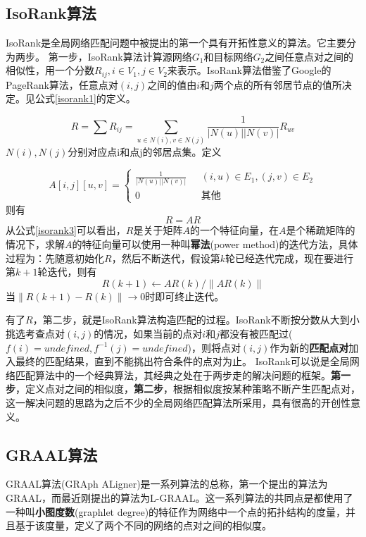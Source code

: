 \subsection{IsoRank算法}
IsoRank是全局网络匹配问题中被提出的第一个具有开拓性意义的算法。它主要分为两步。
第一步，IsoRank算法计算源网络$G_1$和目标网络$G_2$之间任意点对之间的相似性，用一个分数$R_{ij},i\in V_1,j\in V_2$来表示。IsoRank算法借鉴了Google的PageRank算法，任意点对$(i,j)$之间的值由$i$和$j$两个点的所有邻居节点的值所决定。见公式\ref{isorank1}的定义。

\begin{equation}\label{isorank1}
R=\sum R_{ij}=\sum_{u\in N(i),v\in N(j)}\frac{1}{\left | N(u) \right |\left | N(v) \right |}R_{uv}
\end{equation}
$N(i),N(j)$分别对应点i和点j的邻居点集。定义

\begin{equation}\label{isorank2}
A[i,j][u,v]=\begin{cases}
\frac{1}{\left | N(u) \right |\left | N(v) \right |} & \text{  } (i,u)\in E_1, (j,v)\in E_2 \\ 
 0& \text{  } \text{其他}
\end{cases}
\end{equation}
则有
\begin{equation}\label{isorank3}
R=AR
\end{equation}
从公式\ref{isorank3}可以看出，$R$是关于矩阵$A$的一个特征向量，在$A$是个稀疏矩阵的情况下，求解$A$的特征向量可以使用一种叫\textbf{幂法}(power method)的迭代方法，具体过程为：先随意初始化$R$，然后不断迭代，假设第$k$轮已经迭代完成，现在要进行第$k+1$轮迭代，则有
\begin{equation}\label{isorank4}
R(k+1)\leftarrow AR(k)/\left \|AR(k)\right \|
\end{equation}
当$\left \|R(k+1)-R(k)\right \|\rightarrow 0$时即可终止迭代。

有了$R$，第二步，就是IsoRank算法构造匹配的过程。IsoRank不断按分数从大到小挑选考查点对$(i,j)$的情况，如果当前的点对$i$和$j$都没有被匹配过($f(i)=undefined,f^{-1}(j)=undefined$)，则将点对$(i,j)$作为新的\textbf{匹配点对}加入最终的匹配结果，直到不能挑出符合条件的点对为止。
IsoRank可以说是全局网络匹配算法中的一个经典算法，其经典之处在于两步走的解决问题的框架。\textbf{第一步}，定义点对之间的相似度，\textbf{第二步}，根据相似度按某种策略不断产生匹配点对，这一解决问题的思路为之后不少的全局网络匹配算法所采用，具有很高的开创性意义。
\subsection{GRAAL算法}
GRAAL算法(GRAph ALigner)是一系列算法的总称，第一个提出的算法为GRAAL\cite{kuchaiev2010topological}，而最近刚提出的算法为L-GRAAL\cite{malod2015graal}。这一系列算法的共同点是都使用了一种叫\textbf{小图度数}(graphlet degree)的特征作为网络中一个点的拓扑结构的度量，并且基于该度量，定义了两个不同的网络的点对之间的相似度。

